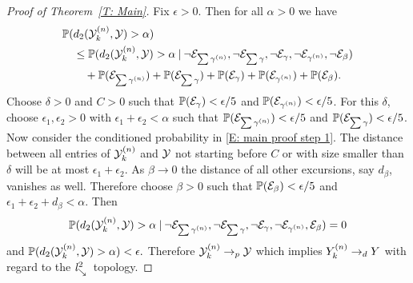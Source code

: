\begin{proof}[Proof of Theorem~\ref{T: Main}]
	Fix $\epsilon > 0$. 
	Then for all $\alpha > 0$ we have 
	\begin{equation} \label{E: main proof step 1}
		\begin{aligned}
		&\mathbb{P}( d_{2}({\mathcal{Y}}^{(n)}_k, {\mathcal{Y}}) > \alpha) \\
		&\quad\leq \mathbb{P}( d_{2}({\mathcal{Y}}^{(n)}_k, {\mathcal{Y}}) > \alpha \: | \: 
			\neg\mathcal{E}_{\sum\gamma^{(n)}}, \neg\mathcal{E}_{\sum\gamma}, \neg\mathcal{E}_{\gamma}, \neg\mathcal{E}_{\gamma^{(n)}}, \neg\mathcal{E}_{\beta}) \\
		&\quad\quad + \mathbb{P}(\mathcal{E}_{\sum\gamma^{(n)}}) + \mathbb{P}(\mathcal{E}_{\sum\gamma}) + \mathbb{P}(\mathcal{E}_{\gamma}) + \mathbb{P}(\mathcal{E}_{\gamma^{(n)}}) + \mathbb{P}(\mathcal{E}_{\beta}).
		\end{aligned}
	\end{equation}
	Choose $\delta > 0$ and $C > 0$ such that $\mathbb{P}(\mathcal{E}_{\gamma}) < \epsilon / 5$ and $\mathbb{P}(\mathcal{E}_{\gamma^{(n)}}) < \epsilon / 5$.
	For this $\delta$, choose $\epsilon_1, \epsilon_2 > 0$ with $\epsilon_1 + \epsilon_2 < \alpha$
	such that $\mathbb{P}(\mathcal{E}_{\sum\gamma^{(n)}}) < \epsilon / 5$ and $\mathbb{P}(\mathcal{E}_{\sum\gamma}) < \epsilon / 5$.
	Now consider the conditioned probability in \eqref{E: main proof step 1}.
	The distance between all entries of ${\mathcal{Y}}^{(n)}_k$ and ${\mathcal{Y}}$ not starting before $C$ or with size smaller than $\delta$ 
	will be at most $\epsilon_1 + \epsilon_2$.
	As $\beta \rightarrow 0$ the distance of all other excursions, say $d_{\beta}$, vanishes as well.
	Therefore choose $\beta > 0$ such that $\mathbb{P}(\mathcal{E}_{\beta}) < \epsilon / 5$ and $\epsilon_1 + \epsilon_2 + d_{\beta} < \alpha$.
	Then
	\begin{equation}
	\mathbb{P}( d_{2}({\mathcal{Y}}^{(n)}_k, {\mathcal{Y}}) > \alpha \: | \: 
	\neg\mathcal{E}_{\sum\gamma^{(n)}}, \neg\mathcal{E}_{\sum\gamma}, \neg\mathcal{E}_{\gamma}, \neg\mathcal{E}_{\gamma^{(n)}}, \mathcal{E}_{\beta}) = 0
	\end{equation}
	and 
	\begin{math}
	\mathbb{P}( d_{2}({\mathcal{Y}}^{(n)}_k, {\mathcal{Y}}) > \alpha) < \epsilon.
	\end{math}
	Therefore ${\mathcal{Y}}^{(n)}_k \rightarrow_p {\mathcal{Y}}$ which implies ${Y}^{(n)}_k \rightarrow_d {Y}$ with regard to the $\mathit{l}^2_{\searrow}$~topology.
\end{proof}


